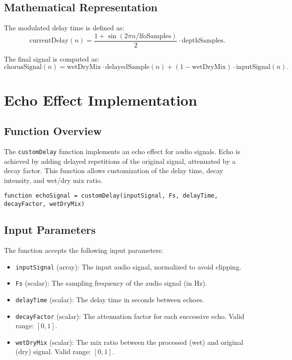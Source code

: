 \documentclass{article}
\begin{document}
\subsection{Mathematical Representation}
The modulated delay time is defined as:
\[
\text{currentDelay}(n) = \frac{1 + \sin(2 \pi n / \text{lfoSamples})}{2} \cdot \text{depthSamples}.
\]

The final signal is computed as:
\[
\text{chorusSignal}(n) = \text{wetDryMix} \cdot \text{delayedSample}(n) + (1 - \text{wetDryMix}) \cdot \text{inputSignal}(n).
\]

\section{Echo Effect Implementation}

\subsection{Function Overview}
The \texttt{customDelay} function implements an echo effect for audio signals. Echo is achieved by adding delayed repetitions of the original signal, attenuated by a decay factor. This function allows customization of the delay time, decay intensity, and wet/dry mix ratio.

\begin{verbatim}
function echoSignal = customDelay(inputSignal, Fs, delayTime, decayFactor, wetDryMix)
\end{verbatim}

\subsection{Input Parameters}
The function accepts the following input parameters:
\begin{itemize}
    \item \texttt{inputSignal} (array): The input audio signal, normalized to avoid clipping.
    \item \texttt{Fs} (scalar): The sampling frequency of the audio signal (in Hz).
    \item \texttt{delayTime} (scalar): The delay time in seconds between echoes.
    \item \texttt{decayFactor} (scalar): The attenuation factor for each successive echo. Valid range: $[0, 1]$.
    \item \texttt{wetDryMix} (scalar): The mix ratio between the processed (wet) and original (dry) signal. Valid range: $[0, 1]$.
\end{itemize}
\end{document}
